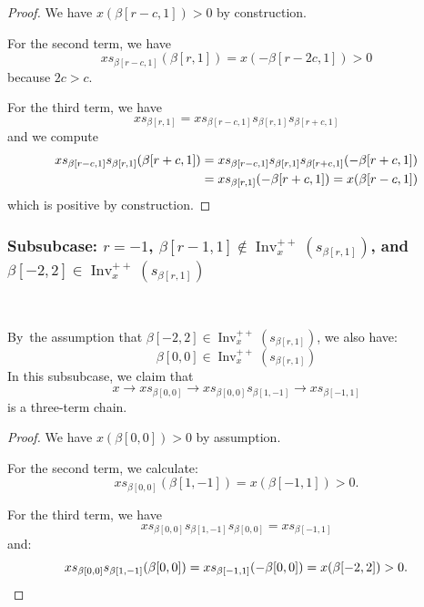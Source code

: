 \documentclass[ALCO,ThmDefs,Unicode]{cedram}
\DeclareMathOperator{\Inv}{Inv}
\newcommand{\Invplusplusx}{\Inv^{++}_x}
\begin{document}
\begin{proof}
We have $x(\beta[r-c,1]) > 0$ by construction.

For the second term, we have
\begin{equation}\label{eq:68}
x s_{\beta[r-c,1]} (\beta[r,1]) = x (- \beta[r-2c,1]) >0
\end{equation}
because $2c > c$.

For the third term, we have
\begin{equation}\label{eq:69}
x s_{\beta[r,1]} = x s_{\beta[r-c,1]} s_{\beta[r,1]} s_{\beta[r+c,1]}
\end{equation}
and we compute
\begin{align}\label{eq:70}
x s_{\beta[r-c,1]} s_{\beta[r,1]} (\beta[r+c,1]) &= x s_{\beta[r-c,1]} s_{\beta[r,1]} s_{\beta[r+c,1]} (-\beta[r+c,1])\\
&= x s_{\beta[r,1]}(-\beta[r+c,1]) = x(\beta[r-c,1]) \notag
\end{align}
which is positive by construction.
\end{proof}

\subsubsection*{Subsubcase: $r=-1$, $\beta[r-1,1] \notin \Invplusplusx(s_{\beta[r,1]})$, and $\beta[-2,2] \in \Invplusplusx(s_{\beta[r,1]})$}\ 

By~the assumption that $\beta[-2,2] \in \Invplusplusx(s_{\beta[r,1]})$, we also have:
\begin{equation}\label{eq:71}
\beta[0,0] \in \Invplusplusx(s_{\beta[r,1]})
\end{equation}
In this subsubcase, we claim that
\begin{equation}\label{eq:72}
x \rightarrow x s_{\beta[0,0]} \rightarrow x s_{\beta[0,0]} s_{\beta[1,-1]} \rightarrow x s_{\beta[-1,1]}
\end{equation}
is a three-term chain.

\begin{proof}
We have $x(\beta[0,0]) > 0$ by assumption.

For the second term, we calculate:
\begin{equation}\label{eq:73}
x s_{\beta[0,0]} (\beta[1,-1]) = x(\beta[-1,1]) > 0.
\end{equation}

For the third term, we have
\begin{equation}\label{eq:75}
x s_{\beta[0,0]} s_{\beta[1,-1]} s_{\beta[0,0]} = x s_{\beta[-1,1]}
\end{equation}
and:
\begin{equation}\label{eq:76}
x s_{\beta[0,0]} s_{\beta[1,-1]} (\beta[0,0]) = x s_{\beta[-1,1]}(- \beta[0,0]) = x (\beta[-2,2]) > 0.\qedhere
\end{equation}
\end{proof}
\end{document}

